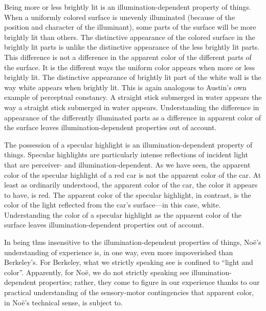 \documentclass[12pt]{article}
\begin{document}
Being more or less brightly lit is an illumination-dependent property of things. When a uniformly colored surface is unevenly illuminated (because of the position and character of the illuminant), some parts of the surface will be more brightly lit than others. The distinctive appearance of the colored surface in the brightly lit parts is unlike the distinctive appearance of the less brightly lit parts. This difference is not a difference in the apparent color of the different parts of the surface. It is the different ways the uniform color appears when more or less brightly lit. The distinctive appearance of brightly lit part of the white wall is the way white appears when brightly lit.  This is again analogous to Austin's own example of perceptual constancy. A straight stick submerged in water appears the way a straight stick submerged in water appears. Understanding the difference in appearance of the differently illuminated parts as a difference in apparent color of the surface leaves illumination-dependent properties out of account.

The possession of a specular highlight is an illumination-dependent property of things. Specular highlights are particularly intense reflections of incident light that are perceiver- and illumination-dependent. As we have seen, the apparent color of the specular highlight of a red car is not the apparent color of the car. At least as ordinarily understood, the apparent color of the car, the color it appears to have, is red. The apparent color of the specular highlight, in contrast, is the color of the light reflected from the car's surface---in this case, white. Understanding the color of a specular highlight as the apparent color of the surface leaves illumination-dependent properties out of account.

In being thus insensitive to the illumination-dependent properties of things, Noë's understanding of experience is, in one way, even more impoverished than Berkeley's. For Berkeley, what we strictly speaking see is confined to ``light and color''. Apparently, for Noë, we do not strictly speaking see illumination-dependent properties; rather, they come to figure in our experience thanks to our practical understanding of the sensory-motor contingencies that apparent color, in Noë's technical sense, is subject to. 
\end{document}

